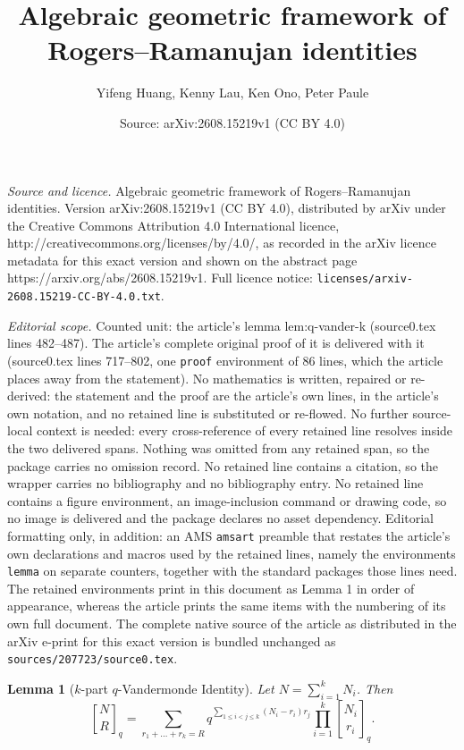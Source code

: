 \documentclass[10pt,a4paper]{amsart}
\title{Algebraic geometric framework of Rogers--Ramanujan identities}
\author{Yifeng Huang, Kenny Lau, Ken Ono, Peter Paule}
\date{Source: arXiv:2608.15219v1 (CC BY 4.0)}
\newtheorem{lemma}{Lemma}
\newcommand{\qbinom}[2]{\genfrac{[}{]}{0pt}{}{#1}{#2}_{\!q}} %
\begin{document}
\maketitle

\noindent\emph{Source and licence.} Algebraic geometric framework of Rogers--Ramanujan identities. Version arXiv:2608.15219v1 (CC BY 4.0), distributed by arXiv under the Creative Commons Attribution 4.0 International licence, http://creativecommons.org/licenses/by/4.0/, as recorded in the arXiv licence metadata for this exact version and shown on the abstract page https://arxiv.org/abs/2608.15219v1. Full licence notice: \texttt{licenses/arxiv-2608.15219-CC-BY-4.0.txt}.\par\smallskip

\noindent\textit{Editorial scope.} Counted unit: the article's lemma lem:q-vander-k (source0.tex lines 482--487). The article's complete original proof of it is delivered with it (source0.tex lines 717--802, one \texttt{proof} environment of 86 lines, which the article places away from the statement). No mathematics is written, repaired or re-derived: the statement and the proof are the article's own lines, in the article's own notation, and no retained line is substituted or re-flowed.  No further source-local context is needed: every cross-reference of every retained line resolves inside the two delivered spans.  Nothing was omitted from any retained span, so the package carries no omission record.  No retained line contains a citation, so the wrapper carries no bibliography and no bibliography entry.  No retained line contains a figure environment, an image-inclusion command or drawing code, so no image is delivered and the package declares no asset dependency.  Editorial formatting only, in addition: an AMS \texttt{amsart} preamble that restates the article's own declarations and macros used by the retained lines, namely the environments \texttt{lemma} on separate counters, together with the standard packages those lines need.  The retained environments print in this document as Lemma 1 in order of appearance, whereas the article prints the same items with the numbering of its own full document.  The complete native source of the article as distributed in the arXiv e-print for this exact version is bundled unchanged as \texttt{sources/207723/source0.tex}.
\begin{lemma}[$k$-part $q$-Vandermonde Identity]\label{lem:q-vander-k}
Let $N = \sum_{i=1}^k N_i$. Then
\begin{equation}\label{eq:q-vander-k}
    \qbinom{N}{R} = \sum_{r_1 + \dots + r_k = R} q^{\sum_{1\le i < j \le k} (N_i - r_i)r_j} \prod_{i=1}^k \qbinom{N_i}{r_i}.
\end{equation}
\end{lemma}
\end{document}
